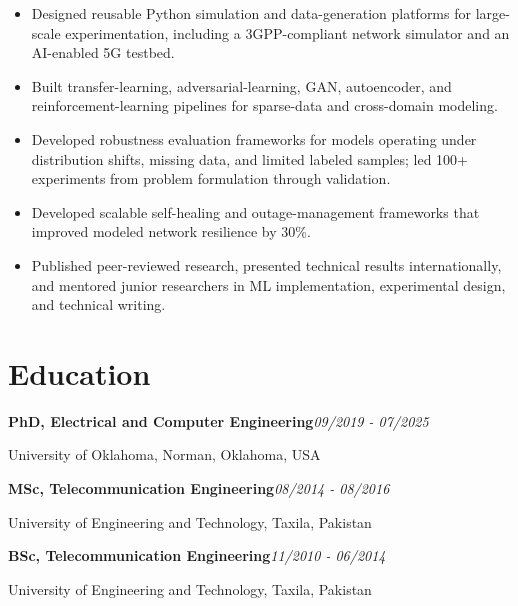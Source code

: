 \documentclass[9pt,letterpaper]{extarticle}
\newcommand{\entry}[2]{\Needspace{4\baselineskip}\textbf{#1}\hfill\textit{#2}\par}
\begin{document}
\begin{itemize}
\item Designed reusable Python simulation and data-generation platforms for large-scale experimentation, including a 3GPP-compliant network simulator and an AI-enabled 5G testbed.
\item Built transfer-learning, adversarial-learning, GAN, autoencoder, and reinforcement-learning pipelines for sparse-data and cross-domain modeling.
\item Developed robustness evaluation frameworks for models operating under distribution shifts, missing data, and limited labeled samples; led 100+ experiments from problem formulation through validation.
\item Developed scalable self-healing and outage-management frameworks that improved modeled network resilience by 30\%.
\item Published peer-reviewed research, presented technical results internationally, and mentored junior researchers in ML implementation, experimental design, and technical writing.
\end{itemize}
\section{Education}
\entry{PhD, Electrical and Computer Engineering}{09/2019 - 07/2025}
University of Oklahoma, Norman, Oklahoma, USA\par
\entry{MSc, Telecommunication Engineering}{08/2014 - 08/2016}
University of Engineering and Technology, Taxila, Pakistan\par
\entry{BSc, Telecommunication Engineering}{11/2010 - 06/2014}
University of Engineering and Technology, Taxila, Pakistan\par
{}
\end{document}
